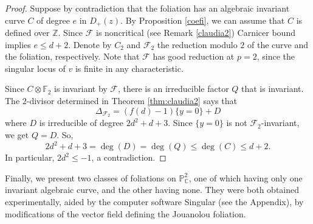 \documentclass[reqno,oneside,11pt]{amsart}
\theoremstyle{definition}
\begin{document}
\begin{proof} Suppose by contradiction that the foliation has an algebraic invariant curve $C$ of degree $e$ in $D_{+}(z)$. By Proposition \ref{coefi}, we can assume that $C$ is defined over $\mathbb{Z}$. Since $\mathcal{F}$ is noncritical (see Remark \ref{claudia2}) Carnicer bound implies $e\leq d+2$. Denote by $C_2$ and $\mathcal{F}_2$ the reduction modulo $2$ of the curve and the foliation, respectively. Note that $\mathcal{F}$ has good reduction at $ p =2 $, since the singular locus of $v$ is finite in any characteristic. 

Since $C\otimes \mathbb{F}_2$ is invariant by $\mathcal{F}$, there is an irreducible factor $Q$ that is invariant. The $2$-divisor determined in Theorem \ref{thm:claudia2} says that 
$$
    \Delta_{\mathcal{F}_2} = (f(d)-1)\{y = 0\}+D
$$
where $D$ is irreducible of degree $2d^2+d+3$. Since $\{y = 0\}$ is not $\mathcal{F}_2$-invariant, we get $Q = D$. So, $$2d^2+d+3=\deg(D) = \deg(Q) \leq \deg(C) \leq d+2.$$ 
In particular, $2d^2 \leq -1$, a contradiction.
\end{proof}

Finally, we present two classes of foliations on $\mathbb{P}^2_\mathbb{C}$, one of which having only one invariant algebraic curve, and the other having none. They were both obtained experimentally, aided by the computer software Singular (see the Appendix), by modifications of the vector field defining the Jouanolou foliation. 
\end{document}
